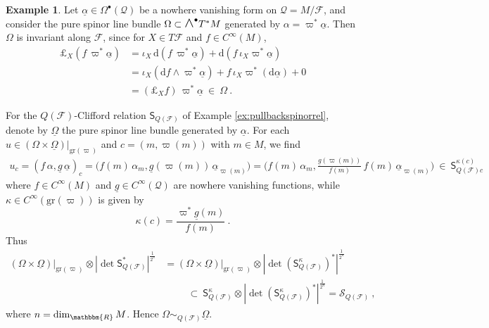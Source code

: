 \documentclass[a4paper, reqno, 11pt]{amsart}
\numberwithin{equation}{section}
\theoremstyle{definition}
\newtheorem{example}[equation]{Example}
\newcommand{\red}[1]{\underline{#1}}
\newcommand{\de}{\mathrm{d}}
\newcommand{\IR}{\mathbbm{R}}
\newcommand{\cS}{{\mathcal S}}
\newcommand{\cQ}{{\mathcal Q}}
\newcommand{\cF}{{\mathcal F}}
\newcommand{\sfS}{{\mathsf{S}}}
\newcommand{\sfOmega}{{\mathsf{\Omega}}}
\newcommand{\midwedge}{\text {\Large$\wedge$}}
\newcommand{\gr}{\text{gr}}
\theoremstyle{remark}
\begin{document}
\begin{example}
    Let $\red \alpha \in \sfOmega^\bullet(\cQ)$ be a nowhere vanishing form on $\cQ = M/\cF$, and consider the pure spinor line bundle  $\Omega \subset \midwedge^\bullet T^*M$ generated by $\alpha = \varpi^*\red \alpha$. Then $\Omega$ is invariant along $\cF$, since for $X\in T\cF$ and $f\in C^\infty(M)$,
    \begin{equation}
    \begin{aligned}
        \pounds_X (f\,\varpi^* \red \alpha) &= \iota_X\, \de (f\,\varpi^* \red \alpha) + \de (f\, \iota_X \varpi^*\red\alpha)\\[4pt]
        &= \iota_X(\de f \wedge \varpi^* \red \alpha) + f\,\iota_X \varpi^*(\de \red \alpha) +0 \\[4pt]
        &= (\pounds_Xf)\, \varpi^* \red \alpha \ \in \ \Omega \ .
    \end{aligned}
    \end{equation}
    
    For the $Q(\cF)$-Clifford relation $\sfS_{Q(\cF)}$ of Example \ref{ex:pullbackspinorrel}, denote by $\red \Omega$ the pure spinor line bundle generated by $\red \alpha$. For each $u \in (\Omega\times \red \Omega) \rvert_{\gr(\varpi)}$ and $c=(m,\varpi(m))$ with $m\in M$,
    we find
    \begin{align}
        u_c = (f\, \alpha, \red g\, \red \alpha)_c = \big(f(m)\, \alpha_m, \red g(\varpi(m))\,\red \alpha_{\varpi(m)}\big) = \big(f(m)\, \alpha_m, \tfrac{\red g(\varpi(m))}{f(m)}\,f(m)\,\red \alpha_{\varpi(m)}\big) \ \in \ \sfS_{Q(\cF)c}^{\kappa(c)}
    \end{align}
    where $f\in C^\infty(M)$ and $\red g \in C^\infty(\cQ)$ are nowhere vanishing functions, while $\kappa\in C^\infty(\gr(\varpi))$ is given by $$\kappa(c) = \frac{\varpi^*\red g(m)}{f(m)} \ . $$ Thus
    \begin{equation}
    \begin{aligned}
        (\Omega \times \red \Omega)\big\rvert_{\gr(\varpi)} \otimes |\det\sfS_{Q(\cF)}^*|^{\frac1{2^n}} &= (\Omega \times \red \Omega)\big\rvert_{\gr(\varpi)} \otimes |\det(\sfS^\kappa_{Q(\cF)})^*|^{\frac1{2^n}} \\
        & \hspace{1cm} \subset \ \sfS_{Q(\cF)}^\kappa \otimes |\det(\sfS^\kappa_{Q(\cF)})^*|^{\frac1{2^n}} = \cS_{Q(\cF)} \ ,
    \end{aligned}
    \end{equation}
where $n=\dim_\IR M$. Hence $\Omega \sim_{Q(\cF)} \red \Omega$.
\end{example}
\end{document}
